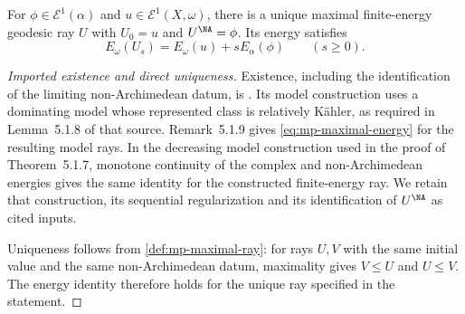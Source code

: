 \noindent\begin{minipage}{\linewidth}
\begin{theorem}\label{thm:mp-maximal-ray}
For $\phi\in\mathcal E^1(\alpha)$ and $u\in\mathcal E^1(X,\omega)$, there is a unique maximal finite-energy geodesic ray $U$ with $U_0=u$ and $U^{\NA}=\phi$. Its energy satisfies
\[
                  E_\omega(U_s)=E_\omega(u)+sE_\alpha(\phi)
                  \qquad(s\geq0).
\tag{60.23f}\label{eq:mp-maximal-energy}
\]
\end{theorem}
\end{minipage}\par

\begin{proof}[Imported existence and direct uniqueness]
Existence, including the identification of the limiting non-Archimedean datum, is \cite[Theorem~5.1.7]{MPTropicalV2}. Its model construction uses a dominating model whose represented class is relatively K\"ahler, as required in Lemma~5.1.8 of that source. Remark~5.1.9 gives \eqref{eq:mp-maximal-energy} for the resulting model rays. In the decreasing model construction used in the proof of Theorem~5.1.7, monotone continuity of the complex and non-Archimedean energies gives the same identity for the constructed finite-energy ray. We retain that construction, its sequential regularization and its identification of $U^{\NA}$ as cited inputs.

Uniqueness follows from \cref{def:mp-maximal-ray}: for rays $U,V$ with the same initial value and the same non-Archimedean datum, maximality gives $V\leq U$ and $U\leq V$. The energy identity therefore holds for the unique ray specified in the statement.
\end{proof}

